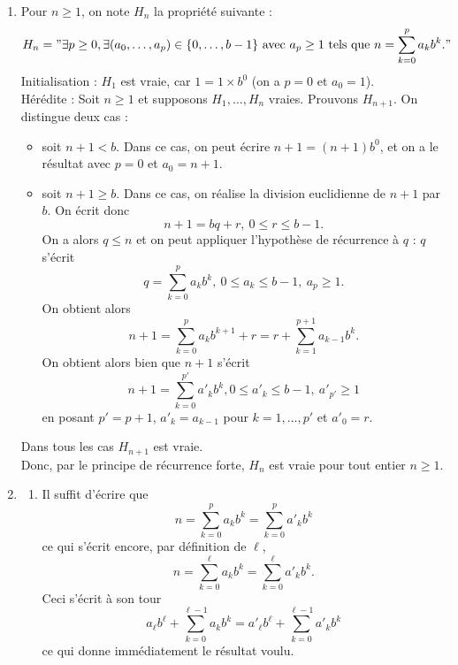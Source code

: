 \documentclass[11pt,a4paper]{article}
\begin{document}
	\begin{corrige}
		\begin{enumerate}
			
			\item  Pour $n\geq 1$, on note $H_n$ la propriété suivante : 
			$$H_n="\exists p\geq 0,\exists (a_0,\dots,a_p)\in\{0,\dots,b-1\}\textrm{ avec }a_p\geq 1\textrm{ tels que }n=\sum_{k=0}^p a_k b^k. "$$
			Initialisation : $H_1$ est vraie, car $1=1\times b^0$ (on a $p=0$ et $a_0=1$).\\
			
			Hérédite : Soit $n\geq 1$ et supposons $H_1,\dots,H_{n}$ vraies. Prouvons $H_{n+1}$. On distingue deux cas : 
			
			\begin{itemize}
				
				\item  soit $n+1<b$. Dans ce cas, on peut écrire $n+1=(n+1)b^0$, et on a le résultat avec $p=0$ et $a_0=n+1$.
				
				\item  soit $n+1\geq b$. Dans ce cas, on réalise la division euclidienne de $n+1$ par $b$. On écrit donc 
				$$n+1=bq+r,\ 0\leq r\leq b-1.$$
				On a alors $q\leq n$ et on peut appliquer l'hypothèse de récurrence à $q$ : $q$ s'écrit 
				$$q=\sum_{k=0}^p a_k b^k,\ 0\leq a_k\leq b-1,\ a_p\geq 1.$$
				On obtient alors 
				$$n+1=\sum_{k=0}^p a_k b^{k+1}+r=r+\sum_{k=1}^{p+1} a_{k-1} b^k.$$
				On obtient alors bien que $n+1$ s'écrit
				$$n+1=\sum_{k=0}^{p'} a'_k b^k, 0\leq a'_k\leq b-1,\ a'_{p'}\geq 1$$
				en posant $p'=p+1$, $a'_k=a_{k-1}$ pour $k= 1,\dots,p'$ et $a'_0=r$.
				
			\end{itemize}
			
			Dans tous les cas $H_{n+1}$ est vraie.\\
			
			Donc, par le principe de récurrence forte, $H_n$ est vraie pour tout entier $n\geq 1$.
			
			\item  
			\begin{enumerate}
				
				\item  Il suffit d'écrire que 
				$$n=\sum_{k=0}^p a_k b^k=\sum_{k=0}^p a'_k b^k$$
				ce qui s'écrit encore, par définition de $\ell$,
				$$n=\sum_{k=0}^\ell a_k b^k=\sum_{k=0}^\ell a'_k b^k.$$
				Ceci s'écrit à son tour 
				$$a_\ell b^\ell+\sum_{k=0}^{\ell-1} a_k b^k=a'_\ell b^\ell+\sum_{k=0}^{\ell-1} a'_k b^k$$
				ce qui donne immédiatement le résultat voulu.
				

\end{enumerate}
\end{enumerate}
\end{corrige}
\end{document}

